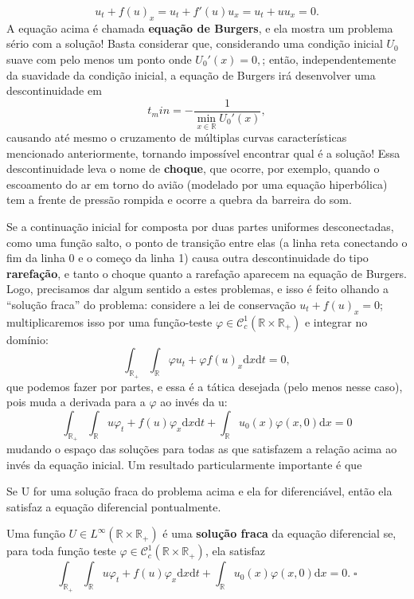 \documentclass[../differential_methods.tex]{subfiles}
\begin{document}
\[
	u_t + f(u)_x = u_t + f'(u) u_x = u_t + uu_x = 0.
\]
A equação acima é chamada \textbf{equação de Burgers}, e ela mostra um problema sério com a solução! Basta considerar que, considerando uma condição inicial \(U_{0}\) suave com pelo menos um ponto onde \(U_0'(x) = 0,\); então, independentemente da suavidade da condição inicial, a equação de Burgers irá desenvolver uma descontinuidade em
\[
	t_min = - \frac{1}{\min\limits_{x\in \mathbb{R}}U_{0}'(x)},
\]
causando até mesmo o cruzamento de múltiplas curvas características mencionado anteriormente, tornando impossível encontrar qual é a solução!
Essa descontinuidade leva o nome de \textbf{choque}, que ocorre, por exemplo, quando o escoamento do ar em torno do avião (modelado por uma equação hiperbólica) tem a frente de pressão rompida e ocorre a quebra da barreira do som.

Se a continuação inicial for composta por duas partes uniformes desconectadas, como uma função salto, o ponto de transição entre elas (a linha reta conectando o fim da linha 0 e o começo da linha 1) causa outra descontinuidade do tipo \textbf{rarefação}, e tanto o choque quanto a rarefação aparecem na equação de Burgers.
Logo, precisamos dar algum sentido a estes problemas, e isso é feito olhando a ``solução fraca'' do problema: considere a lei de conservação \(u_t + f(u)_x = 0\); multiplicaremos isso por uma função-teste \(\varphi \in \mathcal{C}_{c}^{1}(\mathbb{R}\times \mathbb{R}_{+})\) e integrar no domínio:
\[
	\int_{\mathbb{R}_{+}}^{}\int_{\mathbb{R}}^{}\varphi u_t + \varphi f(u)_x \mathrm{d}x \mathrm{d}t=0,
\]
que podemos fazer por partes, e essa é a tática desejada (pelo menos nesse caso), pois muda a derivada para a \(\varphi \) ao invés da u:
\[
	\boxed{\int_{\mathbb{R}_{+}}^{}\int_{\mathbb{R}}^{}u \varphi_t +f(u)\varphi_x\mathrm{d}x \mathrm{d}t + \int_{\mathbb{R}}^{}u_{0}(x)\varphi(x, 0) \mathrm{d}x=0}
\]
mudando o espaço das soluções para todas as que satisfazem a relação acima ao invés da equação inicial. Um resultado particularmente importante é que
\begin{prop*}
	Se U for uma solução fraca do problema acima e ela for diferenciável, então ela satisfaz a equação diferencial pontualmente.
\end{prop*}
\begin{def*}
	Uma função \(U\in L^{\infty}(\mathbb{R}\times \mathbb{R}_{+})\) é uma \textbf{solução fraca} da equação diferencial se, para toda função teste \(\varphi \in \mathcal{C}_{c}^{1}(\mathbb{R}\times \mathbb{R}_{+})\), ela satisfaz
	\[
		\int_{\mathbb{R}_{+}}^{}\int_{\mathbb{R}}^{}u \varphi_t +f(u)\varphi_x\mathrm{d}x \mathrm{d}t + \int_{\mathbb{R}}^{}u_{0}(x)\varphi(x, 0) \mathrm{d}x=0.\; \square
	\]
\end{def*}
\end{document}
